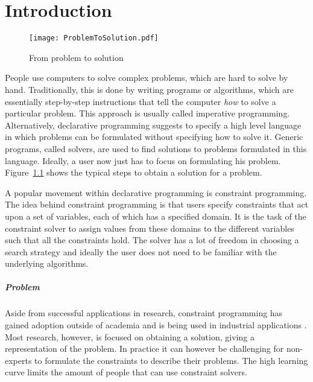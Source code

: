 \chapter{Introduction}
\label{cha:intro}

\begin{figure}

	\caption{From problem to solution}
	\centering
		\texttt{[image: ProblemToSolution.pdf]}
	\label{fig:problem_to_solution}

\end{figure}

People use computers to solve complex problems, which are hard to solve by hand. Traditionally, this is done by writing programs or algorithms, which are essentially step-by-step instructions that tell the computer \emph{how} to solve a particular problem. This approach is usually called imperative programming. Alternatively, declarative programming suggests to specify a high level language in which problems can be formulated without specifying how to solve it. Generic programs, called solvers, are used to find solutions to problems formulated in this language. Ideally, a user now just has to focus on formulating his problem. Figure~\ref{fig:problem_to_solution} shows the typical steps to obtain a solution for a problem.

A popular movement within declarative programming is constraint programming. The idea behind constraint programming is that users specify constraints that act upon a set of variables, each of which has a specified domain. It is the task of the constraint solver to assign values from these domains to the different variables such that all the constraints hold. The solver has a lot of freedom in choosing a search strategy and ideally the user does not need to be familiar with the underlying algorithms.

\paragraph{Problem}
Aside from successful applications in research, constraint programming has gained adoption outside of academia and is being used in industrial applications \cite{Simonis:IndustrialApplicationsCP}. Most research, however, is focused on obtaining a solution, giving a representation of the problem. In practice it can however be challenging for non-experts to formulate the constraints to describe their problems. The high learning curve limits the amount of people that can use constraint solvers.

